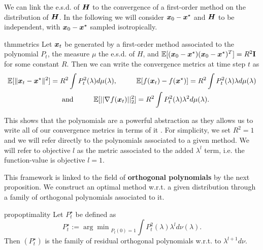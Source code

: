 \documentclass{article}
\begin{document}
We can link the e.s.d. of ${\boldsymbol H}$ to the convergence of a first-order method on the distribution of ${\boldsymbol H}$. In the following we will consider ${\boldsymbol x}_0-{\boldsymbol x}^\star$ and ${\boldsymbol H}$ to be independent, with ${\boldsymbol x}_0-{\boldsymbol x}^\star$ sampled isotropically. %

\begin{restatable}{thm}{metrics} \label{thm: metrics}
Let ${\boldsymbol x}_t$ be generated by a first-order method associated to the polynomial $P_t$, the measure $\mu$ the  e.s.d. of $H$, and $\mathbb{E}[({\boldsymbol x}_0-{\boldsymbol x}^\star)({\boldsymbol x}_0-{\boldsymbol x}^\star)^T]=R^2\textbf{I}$ for some constant $R$. Then we can write the convergence metrics at time step  $t$ as
\begin{equation}
\begin{split}
\label{eq:error_norm_x}
  \mathbb{E}[\|{\boldsymbol x}_t-{\boldsymbol x}^\star\|^2] = { R^2} \int {P_t^2(\lambda) d\mu(\lambda)}, \hspace{1 cm}
    &\mathbb{E}[f({\boldsymbol x}_t)-f({\boldsymbol x}^\star)]=R^2\int P_t^2(\lambda)\lambda d\mu(\lambda)\\
    \text{and} \hspace{1 cm} \mathbb{E}[||\nabla f({\boldsymbol x}_t)||^2_2]&=R^2\int P_t^2(\lambda)\lambda^2d\mu(\lambda) .
\end{split}
\end{equation}
\end{restatable}
This shows that the polynomials are a powerful abstraction as they allows us to write all of our convergence metrics in terms of it . For simplicity, we set $R^2 = 1$ and we will refer directly to the polynomials associated to a given method. We will refer to objective $l$ as the metric associated to the added $\lambda^l$ term, i.e. the function-value is objective $l=1$.

This framework is  linked to the field of \textbf{orthogonal polynomials} by the next proposition. We construct an optimal method w.r.t. a given distribution through a family  of orthogonal polynomials associated to it.


\begin{restatable}{prop}{optimality}\citep{pedregosa2020acceleration}
 \label{prop: optimality}
 Let $P_t^\star$ be defined as
 \begin{equation}
     P_t^\star:={\arg \min}_{P_t(0)=1} \int P_t^2(\lambda) \lambda^l d\nu(\lambda).
 \end{equation}
 Then $(P_t^\star)$ is the family of residual orthogonal polynomials w.r.t. to $\lambda^{l+1}d\nu$.
\end{restatable}
\end{document}
